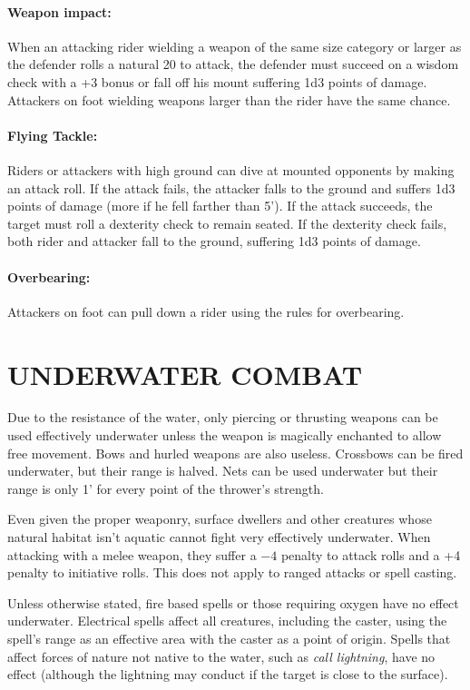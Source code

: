 \begin{multicols}{2}
\paragraph{Weapon impact:} When an attacking rider wielding a weapon of the same size category or larger as the defender rolls a natural 20 to attack, the defender must succeed on a wisdom check with a +3 bonus or fall off his mount suffering 1d3 points of damage.  Attackers on foot wielding weapons larger than the rider have the same chance.

\paragraph{Flying Tackle:}  Riders or attackers with high ground can dive at mounted opponents by making an attack roll.  If the attack fails, the attacker falls to the ground and suffers 1d3 points of damage (more if he fell farther than 5').  If the attack succeeds, the target must roll a dexterity check to remain seated.  If the dexterity check fails, both rider and attacker fall to the ground, suffering 1d3 points of damage.

\paragraph{Overbearing:} Attackers on foot can pull down a rider using the rules for overbearing.

\section{UNDERWATER COMBAT}

Due to the resistance of the water, only piercing or thrusting weapons can be used effectively underwater unless the weapon is magically enchanted to allow free movement.  Bows and hurled weapons are also useless.  Crossbows can be fired underwater, but their range is halved.  Nets can be used underwater but their range is only 1' for every point of the thrower's strength.

Even given the proper weaponry, surface dwellers and other creatures whose natural habitat isn't aquatic cannot fight very effectively underwater.  When attacking with a melee weapon, they suffer a $-4$ penalty to attack rolls and a +4 penalty to initiative rolls. This does not apply to ranged attacks or spell casting.  

Unless otherwise stated, fire based spells or those requiring oxygen have no effect underwater.  Electrical spells affect all creatures, including the caster, using the spell's range as an effective area with the caster as a point of origin.  Spells that affect forces of nature not native to the water, such as \textit{call lightning}, have no effect (although the lightning may conduct if the target is close to the surface).  


\end{multicols}
